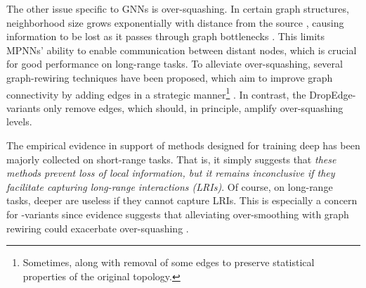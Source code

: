 The other issue specific to GNNs is over-squashing. In certain graph structures, neighborhood size grows exponentially with distance from the source \citep{chen2018fastgcn}, causing information to be lost as it passes through graph bottlenecks \citep{alon2021on}. This limits MPNNs' ability to enable communication between distant nodes, which is crucial for good performance on long-range tasks.
To alleviate over-squashing, several graph-rewiring techniques have been proposed, which aim to improve graph connectivity by adding edges in a strategic manner\footnote{Sometimes, along with removal of some edges to preserve statistical properties of the original topology.} \citep{karhadkar2023fosr,deac2022expander,black2023resistance,nguyen2023revisiting,alon2021on}. In contrast, the DropEdge-variants only remove edges, which should, in principle, amplify over-squashing levels.

The empirical evidence in support of methods designed for training deep  has been majorly collected on short-range tasks. That is, it simply suggests that \emph{these methods prevent loss of local information, but it remains inconclusive if they facilitate capturing long-range interactions (LRIs)}. Of course, on long-range tasks, deeper  are useless if they cannot capture LRIs. This is especially a concern for -variants since evidence suggests that alleviating over-smoothing with graph rewiring could exacerbate over-squashing \citep{nguyen2023revisiting,giraldo2023trading}. %

